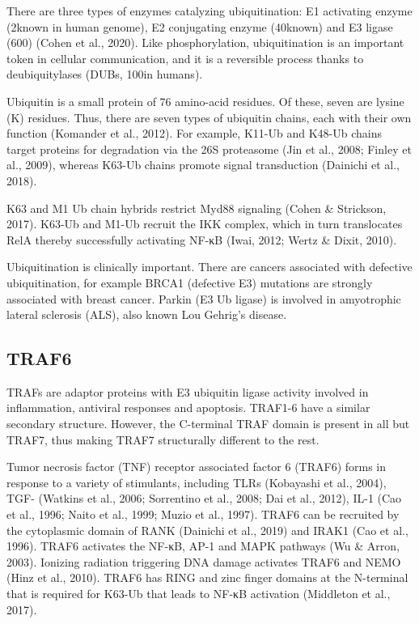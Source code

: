 There are three types of enzymes catalyzing ubiquitination: E1 activating enzyme (2\times known in human genome), E2 conjugating enzyme (40\times known) and E3 ligase (600\times) (Cohen et al., 2020). Like phosphorylation, ubiquitination is an important token in cellular communication, and it is a reversible process thanks to deubiquitylases (DUBs, 100\times in humans).

Ubiquitin is a small protein of 76 amino-acid residues. Of these, seven are lysine (K) residues. Thus, there are seven types of ubiquitin chains, each with their own function (Komander et al., 2012). For example, K11-Ub and K48-Ub chains target proteins for degradation via the 26S proteasome (Jin et al., 2008; Finley et al., 2009), whereas K63-Ub chains promote signal transduction (Dainichi et al., 2018).

K63 and M1 Ub chain hybrids restrict Myd88 signaling (Cohen \& Strickson, 2017). K63-Ub and M1-Ub recruit the IKK complex, which in turn translocates RelA thereby successfully activating NF-κB (Iwai, 2012; Wertz \& Dixit, 2010).

Ubiquitination is clinically important. There are cancers associated with defective ubiquitination, for example BRCA1 (defective E3) mutations are strongly associated with breast cancer. Parkin (E3 Ub ligase) is involved in amyotrophic lateral sclerosis (ALS), also known Lou Gehrig's disease.

\subsection{TRAF6}
\label{subsection:TRAF6}
TRAFs are adaptor proteins with E3 ubiquitin ligase activity involved in inflammation, antiviral responses and apoptosis. TRAF1-6 have a similar secondary structure. However, the C-terminal TRAF domain is present in all but TRAF7, thus making TRAF7 structurally different to the rest. 

Tumor necrosis factor (TNF) receptor associated factor 6 (TRAF6) forms in response to a variety of stimulants, including TLRs (Kobayashi et al., 2004), TGF-{\textbeta} (Watkins et al., 2006; Sorrentino et al., 2008; Dai et al., 2012), IL-1{\textbeta} (Cao et al., 1996; Naito et al., 1999; Muzio et al., 1997). TRAF6 can be recruited by the cytoplasmic domain of RANK (Dainichi et al., 2019) and IRAK1 (Cao et al., 1996). TRAF6 activates the NF-κB, AP-1 and MAPK pathways (Wu \& Arron, 2003). Ionizing radiation triggering DNA damage activates TRAF6 and NEMO (Hinz et al., 2010). TRAF6 has RING and zinc finger domains at the N-terminal that is required for K63-Ub that leads to NF-κB activation (Middleton et al., 2017). 


